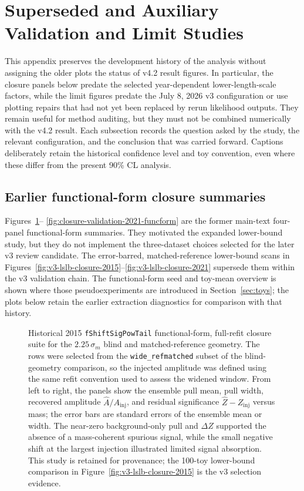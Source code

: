 \section{Superseded and Auxiliary Validation and Limit Studies}
\label{app:prior-validation-results}

This appendix preserves the development history of the analysis without assigning the
older plots the status of v4.2 result figures. In particular, the closure panels below
predate the selected year-dependent lower-length-scale factors, while the limit figures
predate the July 8, 2026 v3 configuration or use plotting repairs that had not yet been
replaced by rerun likelihood outputs. They remain useful for method auditing, but they
must not be combined numerically with the v4.2 result. Each subsection records the
question asked by the study, the relevant configuration, and the conclusion that was
carried forward. Captions deliberately retain the historical confidence level and toy
convention, even where these differ from the present 90\% CL analysis.

\subsection{Earlier functional-form closure summaries}

Figures~\ref{fig:closure-validation-2015-funcform}--%
\ref{fig:closure-validation-2021-funcform} are the former main-text four-panel
functional-form summaries. They motivated the expanded lower-bound study, but they do
not implement the three-dataset choices selected for the later v3 review candidate.
The error-barred, matched-reference lower-bound scans in
Figures~\ref{fig:v3-lslb-closure-2015}--\ref{fig:v3-lslb-closure-2021} supersede
them within the v3 validation chain. The functional-form seed and toy-mean overview
is shown where those pseudoexperiments are introduced in
Section~\ref{sec:toys}; the plots below retain the earlier extraction
diagnostics for comparison with that history.

\begin{figure}[p]
\centering
{}
\caption{Historical 2015 \texttt{fShiftSigPowTail} functional-form, full-refit closure
suite for the $2.25\,\sigma_m$ blind and matched-reference geometry. The rows were
selected from the \texttt{wide\_refmatched} subset of the blind-geometry comparison,
so the injected amplitude was defined using the same refit convention used to assess
the widened window. From left to right, the panels show the ensemble pull mean, pull
width, recovered amplitude $\hat A/A_{\mathrm{inj}}$, and residual significance
$\hat Z-Z_{\mathrm{inj}}$ versus mass; the error bars are standard errors of the
ensemble mean or width. The near-zero background-only pull and $\Delta Z$ supported
the absence of a mass-coherent spurious signal, while the small negative shift at the
largest injection illustrated limited signal absorption. This study is retained for
provenance; the 100-toy lower-bound comparison in
Figure~\ref{fig:v3-lslb-closure-2015} is the v3 selection evidence.}
\label{fig:closure-validation-2015-funcform}
\end{figure}

